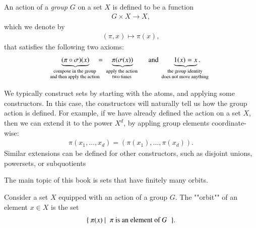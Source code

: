 \begin{definition}\label{def:group-action}
    An action of a \emph{group} $G$ on a set $X$ is defined to be a function 
    \begin{align*}
     G \times X \to X,
    \end{align*}
    which we denote by
    \begin{align*}
    (\pi,x) \mapsto \pi(x),
    \end{align*}
    that satisfies the following two axioms: 
    \begin{align*}
    \myunderbrace{(\pi \circ \sigma)(x)}{compose in the group\\ and then apply the action} \quad = \quad \myunderbrace{\pi(\sigma(x))}{apply the action \\ two times} 
    \qquad \text{and} \qquad 
    \myunderbrace{1(x)=x}{the group identity\\ does not move anything}.
    \end{align*}
\end{definition}



\begin{myexample}[Constructors] 
    \label{ex:group-action-constructors}
    We typically construct sets by starting with the atoms, and applying some constructors.  In this case, the constructors will naturally tell us how the group action is defined.  For example, if we have already defined the action on a set $X$, then we can extend it to the power $X^d$, by appling group elements coordinate-wise:
    \begin{align*}
    \pi(x_1,\ldots,x_d) = (\pi(x_1),\ldots,\pi(x_d)).
    \end{align*}
    Similar extensions can be defined for other constructors, such as disjoint unions, powersets, or subquotients
\end{myexample}

The main topic of this book is sets that have finitely many orbits.

\begin{definition}[Orbit]\label{def:orbit}
    Consider a set $X$ equipped with an action of a group $G$. The  ""orbit"" of an element $x \in X$ is the set 
    \begin{align*}
        \setbuild{ \pi(x)}{$\pi$ is an element of $G$}.
    \end{align*}
\end{definition}

